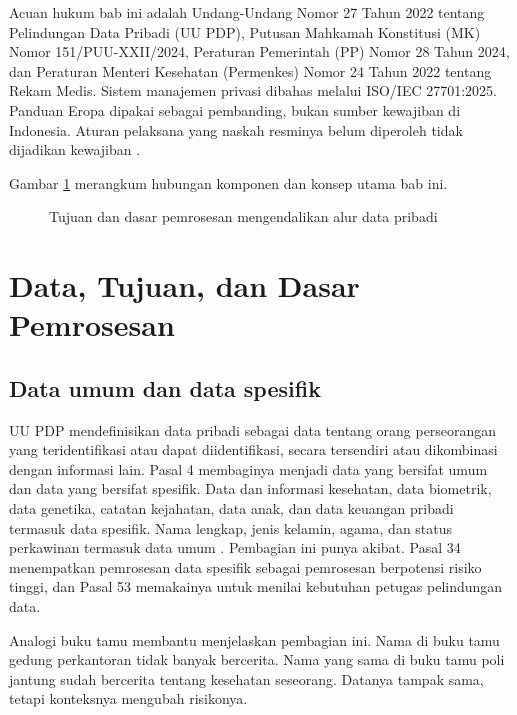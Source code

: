 Acuan hukum bab ini adalah Undang-Undang Nomor 27 Tahun 2022 tentang Pelindungan Data Pribadi (UU
PDP), Putusan Mahkamah Konstitusi (MK) Nomor 151/PUU-XXII/2024, Peraturan Pemerintah (PP) Nomor 28
Tahun 2024, dan Peraturan Menteri Kesehatan (Permenkes) Nomor 24 Tahun 2022 tentang Rekam Medis.
Sistem manajemen privasi dibahas melalui ISO/IEC 27701:2025. Panduan Eropa dipakai sebagai
pembanding, bukan sumber kewajiban di Indonesia. Aturan pelaksana yang naskah resminya belum
diperoleh tidak dijadikan kewajiban
\cite{uu27-2022-pdp,c07-mk151,pp28-2024-kesehatan,permenkes24-2022,c07-iso27701}.

Gambar \ref{fig:ch07-ilustrasi-bab} merangkum hubungan komponen dan konsep utama bab ini.
\begin{figure}[!htb]
  \centering
  
  \caption{Tujuan dan dasar pemrosesan mengendalikan alur data pribadi}
  \label{fig:ch07-ilustrasi-bab}
\end{figure}

\section{Data, Tujuan, dan Dasar Pemrosesan}

\subsection*{Data umum dan data spesifik}

UU PDP mendefinisikan data pribadi sebagai data tentang orang perseorangan yang teridentifikasi atau
dapat diidentifikasi, secara tersendiri atau dikombinasi dengan informasi lain. Pasal 4 membaginya
menjadi data yang bersifat umum dan data yang bersifat spesifik. Data dan informasi kesehatan, data
biometrik, data genetika, catatan kejahatan, data anak, dan data keuangan pribadi termasuk data
spesifik. Nama lengkap, jenis kelamin, agama, dan status perkawinan termasuk data umum
\cite{uu27-2022-pdp}. Pembagian ini punya akibat. Pasal 34 menempatkan pemrosesan data spesifik
sebagai pemrosesan berpotensi risiko tinggi, dan Pasal 53 memakainya untuk menilai kebutuhan petugas
pelindungan data.

Analogi buku tamu membantu menjelaskan pembagian ini. Nama di buku tamu gedung perkantoran tidak
banyak bercerita. Nama yang sama di buku tamu poli jantung sudah bercerita tentang kesehatan
seseorang. Datanya tampak sama, tetapi konteksnya mengubah risikonya.

